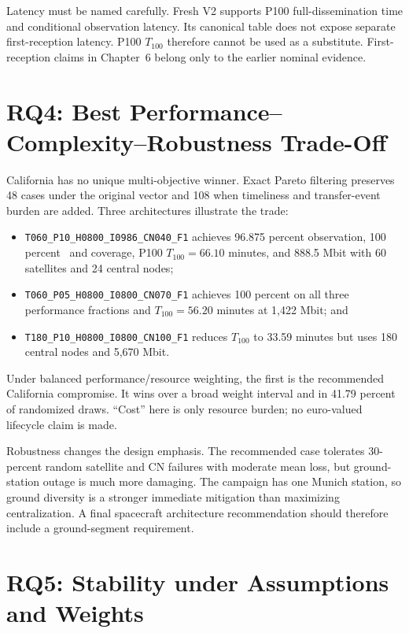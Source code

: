Latency must be named carefully. Fresh V2 supports P100 full-dissemination time and conditional observation latency. Its canonical table does not expose separate first-reception latency. P100 $T_{100}$ therefore cannot be used as a substitute. First-reception claims in Chapter~6 belong only to the earlier nominal evidence.

\section{RQ4: Best Performance--Complexity--Robustness Trade-Off}

California has no unique multi-objective winner. Exact Pareto filtering preserves 48 cases under the original vector and 108 when timeliness and transfer-event burden are added. Three architectures illustrate the trade:

\begin{itemize}
\item \texttt{T060\_P10\_H0800\_I0986\_CN040\_F1} achieves 96.875 percent observation, 100 percent \Suseful\ and coverage, P100 $T_{100}=66.10$ minutes, and 888.5 Mbit with 60 satellites and 24 central nodes;
\item \texttt{T060\_P05\_H0800\_I0800\_CN070\_F1} achieves 100 percent on all three performance fractions and $T_{100}=56.20$ minutes at 1,422 Mbit; and
\item \texttt{T180\_P10\_H0800\_I0800\_CN100\_F1} reduces $T_{100}$ to 33.59 minutes but uses 180 central nodes and 5,670 Mbit.
\end{itemize}

Under balanced performance/resource weighting, the first is the recommended California compromise. It wins over a broad weight interval and in 41.79 percent of randomized draws. ``Cost'' here is only resource burden; no euro-valued lifecycle claim is made.

Robustness changes the design emphasis. The recommended case tolerates 30-percent random satellite and CN failures with moderate mean loss, but ground-station outage is much more damaging. The campaign has one Munich station, so ground diversity is a stronger immediate mitigation than maximizing centralization. A final spacecraft architecture recommendation should therefore include a ground-segment requirement.

\section{RQ5: Stability under Assumptions and Weights}

